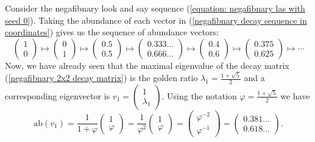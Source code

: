 \documentclass[reqno]{amsart}
\theoremstyle{definition}
\newcommand{\ab}{\text{ab}}
\begin{document}
Consider the negafibnary look and say sequence (\ref{equation: negafibnary las with seed 0}). Taking the abundance of each vector in (\ref{negafibnary decay sequence in coordinates}) gives us the sequence of abundance vectors:
\begin{equation}\label{negafibnary abundance sequence for seed 0}
    \begin{pmatrix}
        1\\ 0
    \end{pmatrix}
    \mapsto
    \begin{pmatrix}
        0\\ 1
    \end{pmatrix}
    \mapsto
    \begin{pmatrix}
        0.5\\ 0.5
    \end{pmatrix}
    \mapsto
    \begin{pmatrix}
        0.333\ldots\\ 0.666\ldots
    \end{pmatrix}
    \mapsto
    \begin{pmatrix}
        0.4\\ 0.6
    \end{pmatrix}
    \mapsto
    \begin{pmatrix}
        0.375\\ 0.625
    \end{pmatrix}
    \mapsto
    \cdots
\end{equation}
Now, we have already seen that the maximal eigenvalue of the decay matrix (\ref{negafibnary 2x2 decay matrix}) is the golden ratio $\lambda_1=\frac{1+\sqrt{5}}{2}$ and a corresponding eigenvector is 
$v_1=
\begin{pmatrix}
    1\\ \lambda_1
\end{pmatrix}$. Using the notation $\varphi=\frac{1+\sqrt{5}}{2}$ we have
\begin{equation}\label{abundance for negafibnary with seed 0}
    \ab(v_1)
    =\frac{1}{1+\varphi}
    \begin{pmatrix}
        1\\ \varphi
    \end{pmatrix}
    =\frac{1}{\varphi^2}
    \begin{pmatrix}
        1\\ \varphi
    \end{pmatrix}
    =\begin{pmatrix}
        \varphi^{-2}\\ \varphi^{-1}
    \end{pmatrix}
    =
    \begin{pmatrix}
        0.381\ldots\\ 0.618\ldots
    \end{pmatrix}.
\end{equation}
\end{document}

